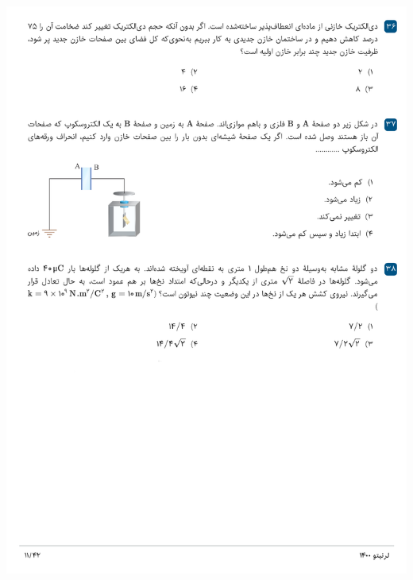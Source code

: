 \documentclass{book}
\begin{document}
\includegraphics[width=\textwidth]{"pages/11"}
\end{document}
